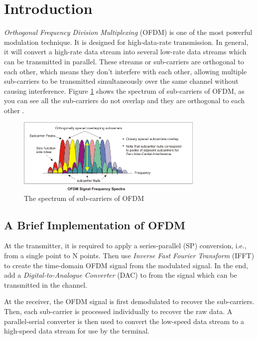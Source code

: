 \documentclass[10pt]{article}
\numberwithin{figure}{section}
\numberwithin{equation}{section}
\begin{document}
\pagestyle{plain}
\setcounter{page}{1}

\section{Introduction}
\textit{Orthogonal Frequency Division Multiplexing} (OFDM) is one of the most powerful modulation technique. It is designed for high-data-rate transmission. In general, it will convert a high-rate data stream into several low-rate data streams which can be transmitted in parallel\cite{RN79}. These streams or sub-carriers are orthogonal to each other, which means they don't interfere with each other, allowing multiple sub-carriers to be transmitted simultaneously over the same channel without causing interference. Figure \ref{fig:subcarriers} shows the spectrum of sub-carriers of OFDM, as you can see all the sub-carriers do not overlap and they are orthogonal to each other \cite{RN80}.
\begin{figure}[!ht]
    \centering
    \includegraphics[width=0.8\textwidth]{images/subcarriers.png}
    \caption{\label{fig:subcarriers}The spectrum of sub-carriers of OFDM}
\end{figure}
\subsection{A Brief Implementation of OFDM}
At the transmitter, it is required to apply a series-parallel (SP) conversion, i.e., from a single point to N points. Then use \textit{Inverse Fast Fourier Transform} (IFFT) to create the time-domain OFDM signal from the modulated signal. In the end, add a \textit{Digital-to-Analogue Converter} (DAC) to from the signal which can be transmitted in the channel.

At the receiver, the OFDM signal is first demodulated to recover the sub-carriers. Then, each sub-carrier is processed individually to recover the raw data. A parallel-serial converter is then used to convert the low-speed data stream to a high-speed data stream for use by the terminal.
\end{document}
